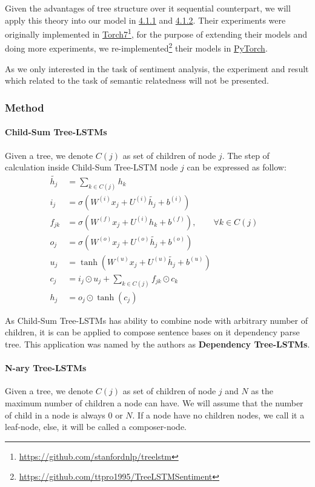 Given the advantages of tree structure over it sequential counterpart, we will apply this theory into our model in \hyperref[sec:VTtree]{4.1.1} and \hyperref[sec:CNNtree]{4.1.2}. 
Their experiments were originally implemented in \hyperref[sec:torch]{Torch7}\footnote{\url{https://github.com/stanfordnlp/treelstm}}, for the purpose of extending their models and doing more experiments, we re-implemented\footnote{\url{https://github.com/ttpro1995/TreeLSTMSentiment}} their models in \hyperref[sec:pytorch]{PyTorch}. 

As we only interested in  the task of sentiment analysis, the experiment and result which related to the task of semantic relatedness will not be presented.

\subsubsection{Method}
\paragraph{Child-Sum Tree-LSTMs}
Given a tree, we denote \(C(j)\) as set of children of node \(j\).
The step of calculation inside Child-Sum Tree-LSTM node \(j\) can be expressed as follow\cite{treeLSTM}:
\begin{align}
  	\tilde{h_j} &= \sum_{k \in C(j)} h_k &\label{eq1:2}\\
  	i_j &= \sigma{(W^{(i)}x_j + U^{(i)}\tilde{h_j} + b^{(i)})} &\label{eq1:3}\\
  	f_{jk} &= \sigma{(W^{(f)}x_j + U^{(i)}h_k + b^{(f)})}, \qquad  \forall k \in C(j) & \label{eq1:foget1}\\
  	o_j &= \sigma{(W^{(o)}x_j + U^{(o)}\tilde{h_j} + b^{(o)})} &\label{eq1:5}\\
  	u_j &= \tanh{(W^{(u)}x_j + U^{(u)}\tilde{h_j} + b^{(u)})} &\label{eq1:6}\\
   	c_j &= i_j \odot u_j + \sum_{k \in C(j)} f_{jk} \odot c_k & \\
	h_j &= o_j \odot \tanh{(c_j)} &
\end{align}

As Child-Sum Tree-LSTMs has ability to combine node with arbitrary number of children, it is can be applied to compose sentence bases on it dependency parse tree.
This application was named by the authors as \textbf{Dependency Tree-LSTMs}\cite{treeLSTM}.

\paragraph{N-ary Tree-LSTMs}
Given a tree, we denote \(C(j)\) as set of children of node \(j\) and \(N\) as the maximum number of children a node can have. 
We will assume that the number of child in a node is always \(0\) or \(N\). 
If a node have no children nodes, we call it a leaf-node, else, it will be called a composer-node. 

